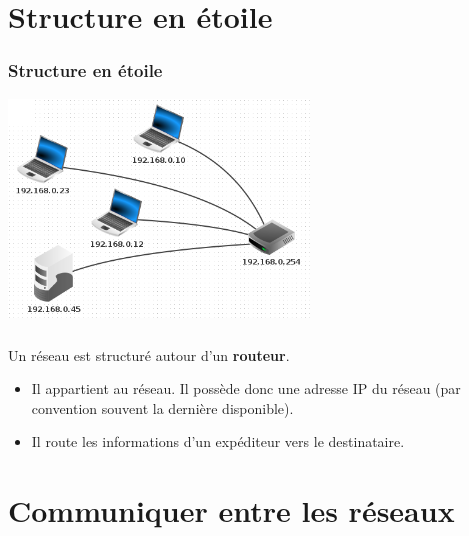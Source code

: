 \documentclass[svgnames,11pt]{beamer}
\begin{document}
\section{Structure en étoile}
\begin{frame}
    \frametitle{Structure en étoile}

    \begin{center}
        \centering
        \includegraphics[width=8cm]{ressources/etoile.png}
        \label{IMG}
    \end{center}

\end{frame}
\begin{frame}
    \frametitle{}

    \begin{aretenir}[]
        Un réseau est structuré autour d'un \textbf{routeur}.
        \begin{itemize}
            \item<1-> Il appartient au réseau. Il possède donc une adresse IP du réseau (par convention souvent la dernière disponible).
            \item<2-> Il route les informations d'un expéditeur vers le destinataire.
        \end{itemize}
    \end{aretenir}

\end{frame}
\section{Communiquer entre les réseaux}
\end{document}
